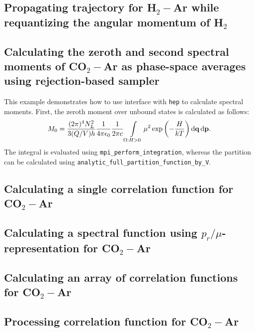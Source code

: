 \documentclass{article}
\newcommand{\lb}{\left(}
\newcommand{\rb}{\right)}
\newcommand{\mf}{\mathbf}
\newcommand*\diff{\mathop{}\!\mathrm{d}}
\begin{document}
\subsection{Propagating trajectory for H$_2-$Ar while requantizing the angular momentum of H$_2$}
\label{subsec:example-req-trajectory}

\subsection{Calculating the zeroth and second spectral moments of CO$_2-$Ar as phase-space averages using rejection-based sampler}
\label{subsec:example-spmoments-co2-ar}

This example demonstrates how to use interface with \texttt{hep} to calculate spectral moments. 
First, the zeroth moment over unbound states is calculated as follows:
\begin{gather}
    M_0 = \frac{(2 \pi)^4 N_L^2}{3 (Q/V) h} \frac{1}{4 \pi \epsilon_0} \frac{1}{2 \pi c} \int\limits_{\Omega: H > 0} \mu^2 \exp \lb -\frac{H}{kT} \rb \diff{\mf{q}} \diff{\mf{p}}. \notag
\end{gather}
%
The integral is evaluated using \texttt{mpi\_perform\_integration}, whereas the partition can be calculated using \texttt{analytic\_full\_partition\_function\_by\_V}.    


\subsection{Calculating a single correlation function for CO$_2-$Ar}
\label{subsec:example-correlation-co2-ar}

\subsection{Calculating a spectral function using $p_r/\mu$-representation for CO$_2-$Ar}
\label{subsec:example-prmu-co2-ar}

\subsection{Calculating an array of correlation functions for CO$_2-$Ar}
\label{subsec:example-correlation-array-co2-ar}

\subsection{Processing correlation function for CO$_2-$Ar}
\label{subsec:example-processing}
\end{document}
